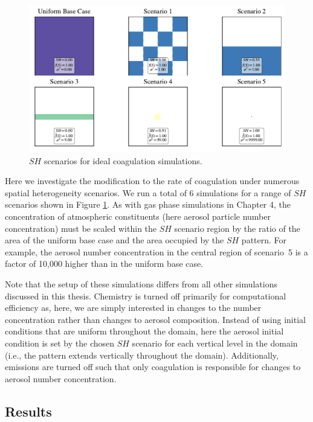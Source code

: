 \begin{figure}[h]
  \centering
    \includegraphics[width=\textwidth]{figures/chapter5/ideal-coag/ideal-coag-SH-scenarios.pdf}
    \caption{$SH$ scenarios for ideal coagulation simulations.}
    \label{fig:sh-scenarios-ideal-coag}
\end{figure}

Here we investigate the modification to the rate of coagulation under numerous spatial heterogeneity scenarios. We run a total of 6 simulations for a range of $SH$ scenarios shown in Figure \ref{fig:sh-scenarios-ideal-coag}. As with gas phase simulations in Chapter 4, the concentration of atmospheric constituents (here aerosol particle number concentration) must be scaled within the $SH$ scenario region by the ratio of the area of the uniform base case and the area occupied by the $SH$ pattern. For example, the aerosol number concentration in the central region of scenario~5 is a factor of 10,000 higher than in the uniform base case. 

Note that the setup of these simulations differs from all other simulations discussed in this thesis. Chemistry is turned off primarily for computational efficiency as, here, we are simply interested in changes to the number concentration rather than changes to aerosol composition. Instead of using initial conditions that are uniform throughout the domain, here the aerosol initial condition is set by the chosen $SH$ scenario for each vertical level in the domain (i.e., the pattern extends vertically throughout the domain). Additionally, emissions are turned off such that only coagulation is responsible for changes to aerosol number concentration.

\subsection{Results}\label{ideal-coag-results}

